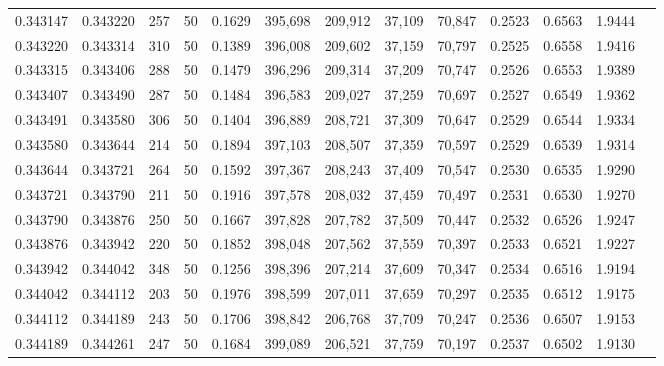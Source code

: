 \begin{tabular}{rrrrrrrrrrrrr}
0.343147 & 0.343220 &   257 &  50 &                                     0.1629 & 395,698 & 209,912 &  37,109 &  70,847 & 0.2523 & 0.6563 & 1.9444 \\
0.343220 & 0.343314 &   310 &  50 &                                     0.1389 & 396,008 & 209,602 &  37,159 &  70,797 & 0.2525 & 0.6558 & 1.9416 \\
0.343315 & 0.343406 &   288 &  50 &                                     0.1479 & 396,296 & 209,314 &  37,209 &  70,747 & 0.2526 & 0.6553 & 1.9389 \\
0.343407 & 0.343490 &   287 &  50 &                                     0.1484 & 396,583 & 209,027 &  37,259 &  70,697 & 0.2527 & 0.6549 & 1.9362 \\
0.343491 & 0.343580 &   306 &  50 &                                     0.1404 & 396,889 & 208,721 &  37,309 &  70,647 & 0.2529 & 0.6544 & 1.9334 \\
0.343580 & 0.343644 &   214 &  50 &                                     0.1894 & 397,103 & 208,507 &  37,359 &  70,597 & 0.2529 & 0.6539 & 1.9314 \\
0.343644 & 0.343721 &   264 &  50 &                                     0.1592 & 397,367 & 208,243 &  37,409 &  70,547 & 0.2530 & 0.6535 & 1.9290 \\
0.343721 & 0.343790 &   211 &  50 &                                     0.1916 & 397,578 & 208,032 &  37,459 &  70,497 & 0.2531 & 0.6530 & 1.9270 \\
0.343790 & 0.343876 &   250 &  50 &                                     0.1667 & 397,828 & 207,782 &  37,509 &  70,447 & 0.2532 & 0.6526 & 1.9247 \\
0.343876 & 0.343942 &   220 &  50 &                                     0.1852 & 398,048 & 207,562 &  37,559 &  70,397 & 0.2533 & 0.6521 & 1.9227 \\
0.343942 & 0.344042 &   348 &  50 &                                     0.1256 & 398,396 & 207,214 &  37,609 &  70,347 & 0.2534 & 0.6516 & 1.9194 \\
0.344042 & 0.344112 &   203 &  50 &                                     0.1976 & 398,599 & 207,011 &  37,659 &  70,297 & 0.2535 & 0.6512 & 1.9175 \\
0.344112 & 0.344189 &   243 &  50 &                                     0.1706 & 398,842 & 206,768 &  37,709 &  70,247 & 0.2536 & 0.6507 & 1.9153 \\
0.344189 & 0.344261 &   247 &  50 &                                     0.1684 & 399,089 & 206,521 &  37,759 &  70,197 & 0.2537 & 0.6502 & 1.9130 \\

\end{tabular}
